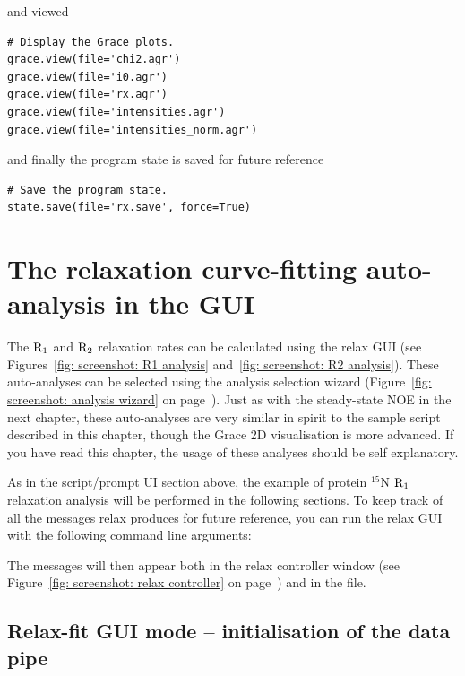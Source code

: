 and viewed

\begin{lstlisting}[firstnumber=88]
# Display the Grace plots.
grace.view(file='chi2.agr')
grace.view(file='i0.agr')
grace.view(file='rx.agr')
grace.view(file='intensities.agr')
grace.view(file='intensities_norm.agr')
\end{lstlisting}

and finally the program state is saved for future reference

\begin{lstlisting}[firstnumber=95]
# Save the program state.
state.save(file='rx.save', force=True)
\end{lstlisting}




\newpage
\section{The relaxation curve-fitting auto-analysis in the GUI}

The $\mathrm{R}_1$ and $\mathrm{R}_2$ relaxation rates can be calculated using the relax GUI (see Figures~\ref{fig: screenshot: R1 analysis} and~\ref{fig: screenshot: R2 analysis}).  These auto-analyses can be selected using the analysis selection wizard (Figure~\ref{fig: screenshot: analysis wizard} on page~\pageref{fig: screenshot: analysis wizard}).  Just as with the steady-state NOE in the next chapter, these auto-analyses are very similar in spirit to the sample script described in this chapter, though the Grace 2D visualisation is more advanced.  If you have read this chapter, the usage of these analyses should be self explanatory.

As in the script/prompt UI section above, the example of protein $^{15}$N $\mathrm{R}_1$ relaxation analysis will be performed in the following sections.  To keep track of all the messages relax produces for future reference, you can run the relax GUI with the following command line arguments:


The messages will then appear both in the relax controller window (see Figure~\ref{fig: screenshot: relax controller} on page~\pageref{fig: screenshot: relax controller}) and in the  file.



\subsection{Relax-fit GUI mode -- initialisation of the data pipe}

